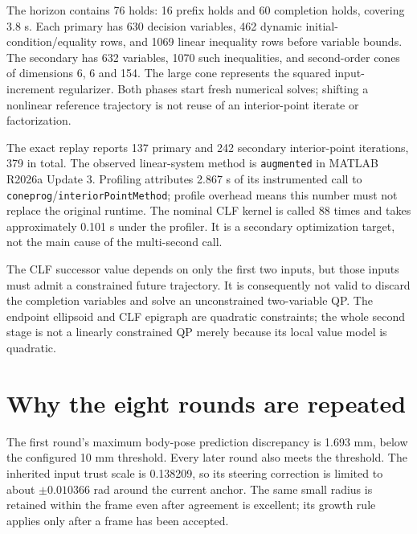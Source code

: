 \documentclass[11pt]{article}
\begin{document}
The horizon contains 76 holds: 16 prefix holds and 60 completion holds,
covering 3.8 s. Each primary has 630 decision variables, 462 dynamic
initial-condition/equality rows, and 1069 linear inequality rows before
variable bounds. The secondary has 632 variables, 1070 such inequalities,
and second-order cones of dimensions 6, 6 and 154. The large cone represents
the squared input-increment regularizer. Both phases start fresh numerical
solves; shifting a nonlinear reference trajectory is not reuse of an
interior-point iterate or factorization.

The exact replay reports 137 primary and 242 secondary interior-point
iterations, 379 in total. The observed linear-system method is
\texttt{augmented} in MATLAB R2026a Update 3. Profiling attributes 2.867 s
of its instrumented call to \texttt{coneprog}/\texttt{interiorPointMethod};
profile overhead means this number must not replace the original runtime.
The nominal CLF kernel is called 88 times and takes approximately 0.101 s
under the profiler. It is a secondary optimization target, not the main cause
of the multi-second call.

The CLF successor value depends on only the first two inputs, but those inputs
must admit a constrained future trajectory. It is consequently not valid to
discard the completion variables and solve an unconstrained two-variable QP.
The endpoint ellipsoid and CLF epigraph are quadratic constraints; the whole
second stage is not a linearly constrained QP merely because its local value
model is quadratic.

\section{Why the eight rounds are repeated}
The first round's maximum body-pose prediction discrepancy is 1.693 mm,
below the configured 10 mm threshold. Every later round also meets the
threshold. The inherited input trust scale is 0.138209, so its steering
correction is limited to about $\pm0.010366$ rad around the current anchor.
The same small radius is retained within the frame even after agreement is
excellent; its growth rule applies only after a frame has been accepted.
\end{document}
